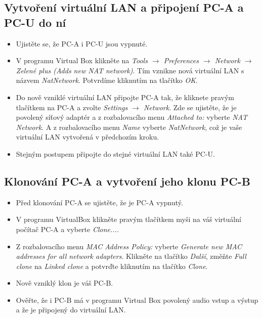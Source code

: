 \subsection{Vytvoření virtuální LAN a připojení PC-A a PC-U do ní}
\begin{itemize}
  \item Ujistěte se, že PC-A i PC-U jsou vypnuté.
  \item V programu Virtual Box klikněte na \emph{Tools $\rightarrow$ Preferences $\rightarrow$ Network $\rightarrow$ Zelené plus (Adds new NAT network)}. Tím vznikne nová virtuální LAN s názvem \emph{NatNetwork}. Potvrdíme kliknutím na tlačítko \emph{OK}.
  \item Do nově vzniklé virtuální LAN připojte PC-A tak, že kliknete pravým tlačítkem na PC-A a zvolte \emph{Settings $\rightarrow$ Network}. Zde se ujistěte, že je povolený síťový adaptér a z rozbalovacího menu \emph{Attached to:} vyberte \emph{NAT Network}. A z rozbalovacího menu \emph{Name} vyberte \emph{NatNetwork}, což je vaše virtuální LAN vytvořená v předchozím kroku.
  \item Stejným postupem připojte do stejné virtuální LAN také PC-U.
\end{itemize}


\subsection{Klonování PC-A a vytvoření jeho klonu PC-B}
\begin{itemize}
	\item Před klonování PC-A se ujistěte, že je PC-A vypnutý.
	\item V programu VirtualBox klikněte pravým tlačítkem myši na váš virtuální počítač PC-A a vyberte \emph{Clone...}.
	\item Z rozbalovacího menu \emph{MAC Address Policy:} vyberte \emph{Generate new MAC addresses for all network adapters}. Klikněte na tlačítko \emph{Další}, změňte \emph{Full clone} na \emph{Linked clone} a potvrďte kliknutím na tlačítko \emph{Clone}.
	\item Nově vzniklý klon je váš PC-B.
	\item Ověřte, že i PC-B má v programu Virtual Box povolený audio vstup a výstup a že je připojený do virtuální LAN.
\end{itemize}


